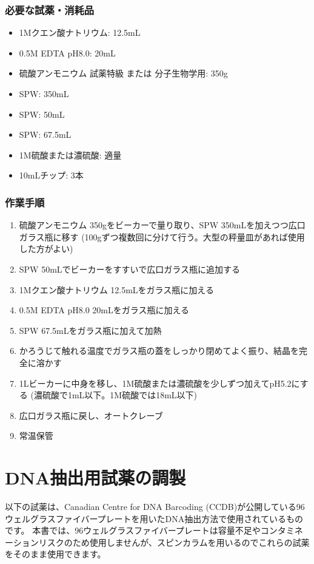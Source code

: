 \documentclass[titlepage,10pt,a4paper,uplatex]{jsbook}
\begin{document}
\subsubsection{必要な試薬・消耗品}
\begin{itemize}
\item 1Mクエン酸ナトリウム: 12.5mL
\item 0.5M EDTA pH8.0: 20mL
\item 硫酸アンモニウム 試薬特級 または 分子生物学用: 350g
\item SPW: 350mL
\item SPW: 50mL
\item SPW: 67.5mL
\item 1M硫酸または濃硫酸: 適量
\item 10mLチップ: 3本
\end{itemize}

\subsubsection{作業手順}
\begin{enumerate}
\item 硫酸アンモニウム 350gをビーカーで量り取り、SPW 350mLを加えつつ広口ガラス瓶に移す (100gずつ複数回に分けて行う。大型の秤量皿があれば使用した方がよい)
\item SPW 50mLでビーカーをすすいで広口ガラス瓶に追加する
\item 1Mクエン酸ナトリウム 12.5mLをガラス瓶に加える
\item 0.5M EDTA pH8.0 20mLをガラス瓶に加える
\item SPW 67.5mLをガラス瓶に加えて加熱
\item かろうじて触れる温度でガラス瓶の蓋をしっかり閉めてよく振り、結晶を完全に溶かす
\item 1Lビーカーに中身を移し、1M硫酸または濃硫酸を少しずつ加えてpH5.2にする (濃硫酸で1mL以下。1M硫酸では18mL以下)
\item 広口ガラス瓶に戻し、オートクレーブ
\item 常温保管
\end{enumerate}

\section{DNA抽出用試薬の調製}\label{makingDNAextractionbuffers}

以下の試薬は、Canadian Centre for DNA Barcoding (CCDB)が公開している96ウェルグラスファイバープレートを用いたDNA抽出方法\citep{Ivanova2006}で使用されているものです。
本書では、96ウェルグラスファイバープレートは容量不足やコンタミネーションリスクのため使用しませんが、スピンカラムを用いるのでこれらの試薬をそのまま使用できます。
\end{document}
